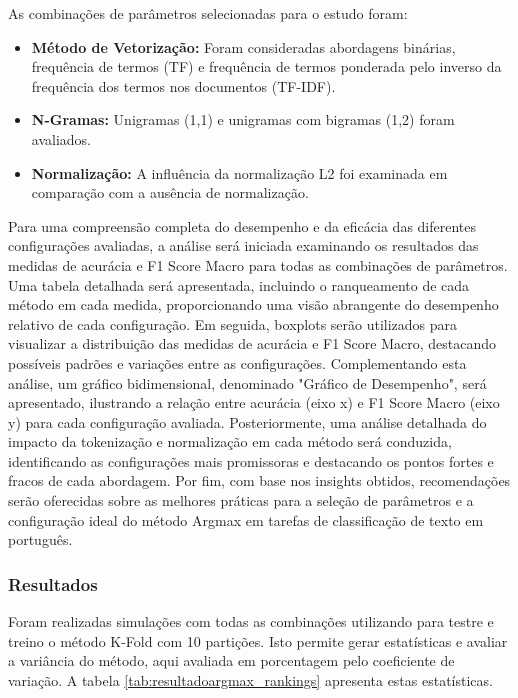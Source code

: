 As combinações de parâmetros selecionadas para o estudo foram:

\begin{itemize}
    \item \textbf{Método de Vetorização:} Foram consideradas abordagens binárias, frequência de termos (TF) e frequência de termos ponderada pelo inverso da frequência dos termos nos documentos (TF-IDF).
    \item \textbf{N-Gramas:} Unigramas (1,1) e unigramas com bigramas (1,2) foram avaliados.
    \item \textbf{Normalização:} A influência da normalização L2 foi examinada em comparação com a ausência de normalização.
\end{itemize}

Para uma compreensão completa do desempenho e da eficácia das diferentes configurações avaliadas, a análise será iniciada examinando os resultados das medidas de acurácia e F1 Score Macro para todas as combinações de parâmetros. Uma tabela detalhada será apresentada, incluindo o ranqueamento de cada método em cada medida, proporcionando uma visão abrangente do desempenho relativo de cada configuração. Em seguida, boxplots serão utilizados para visualizar a distribuição das medidas de acurácia e F1 Score Macro, destacando possíveis padrões e variações entre as configurações. Complementando esta análise, um gráfico bidimensional, denominado "Gráfico de Desempenho", será apresentado, ilustrando a relação entre acurácia (eixo x) e F1 Score Macro (eixo y) para cada configuração avaliada. Posteriormente, uma análise detalhada do impacto da tokenização e normalização em cada método será conduzida, identificando as configurações mais promissoras e destacando os pontos fortes e fracos de cada abordagem. Por fim, com base nos insights obtidos, recomendações serão oferecidas sobre as melhores práticas para a seleção de parâmetros e a configuração ideal do método Argmax em tarefas de classificação de texto em português.

\subsubsection{Resultados}

    Foram realizadas simulações com todas as combinações utilizando para testre e treino o método K-Fold com 10 partições.  Isto permite gerar estatísticas e avaliar a variância do método, aqui avaliada em porcentagem pelo coeficiente de variação.  A tabela \ref{tab:resultadoargmax_rankings} apresenta estas estatísticas.

